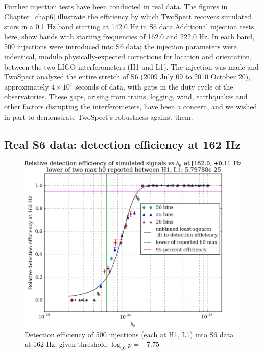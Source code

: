 
Further injection tests have been conducted in real data.
The figures in Chapter~\ref{chap6} illustrate the efficiency by which TwoSpect recovers simulated stars in a 0.1 Hz band starting at 142.0 Hz in S6 data.Additional injection tests, here, show bands with starting frequencies of 162.0 and 222.0 Hz.
In each band, 500 injections were introduced into S6 data; the injection parameters were indentical, modulo physically-expected corrections for location and orientation, between the two LIGO interferometers (H1 and L1).
The injection was made and TwoSpect analyzed the entire stretch of S6 (2009 July 09 to 2010 October 20), approximately $4 \times 10^7$ seconds of data, with gaps in the duty cycle of the observatories.
These gaps, arising from trains, logging, wind, earthquakes and other factors disrupting the interferometers, have been a concern, and we wished in part to demonstrate TwoSpect's robustness against them.


\subsection{Real S6 data: detection efficiency at 162 Hz}

\begin{figure}
\begin{center}
\includegraphics[width=0.5\paperwidth,height=0.35\paperheight]{plots/detectionEfficiencyh0-162-0Hz.eps}
\caption{
Detection efficiency of 500 injections (each at H1, L1) into
S6 data at 162 Hz, given threshold $\log_{10}p = -7.75$}
\label{S6_det_eff_162}
\end{center}
\end{figure}


